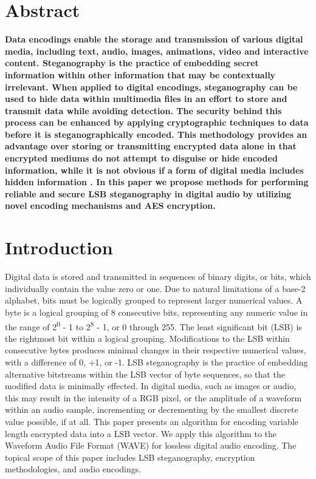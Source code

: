 \section*{Abstract}
\textbf{
Data encodings enable the storage and transmission of various digital media, including text, audio, images, animations, video and interactive content. Steganography is the practice of embedding secret information within other information that may be contextually irrelevant. When applied to digital encodings, steganography can be used to hide data within multimedia files in an effort to store and transmit data while avoiding detection. The security behind this process can be enhanced by applying cryptographic techniques to data before it is steganographically encoded. This methodology provides an advantage over storing or transmitting encrypted data alone in that encrypted mediums do not attempt to disguise or hide encoded information, while it is not obvious if a form of digital media includes hidden information \cite{paper8}. In this paper we propose methods for performing reliable and secure LSB steganography in digital audio by utilizing novel encoding mechanisms and AES encryption.}


\section{Introduction}
Digital data is stored and transmitted in sequences of binary digits, or bits, which individually contain the value zero or one. Due to natural limitations of a base-2 alphabet, bits must be logically grouped to represent larger numerical values. A byte is a logical grouping of 8 consecutive bits, representing any numeric value in the range of 2\textsuperscript{0} - 1 to 2\textsuperscript{8} - 1, or 0 through 255. The least significant bit (LSB) is the rightmost bit within a logical grouping. Modifications to the LSB within consecutive bytes produces minimal changes in their respective numerical values, with a difference of 0, +1, or -1.
LSB steganography is the practice of embedding alternative bitstreams within the LSB vector of byte sequences, so that the modified data is minimally effected. In digital media, such as images or audio, this may result in the intensity of a RGB pixel, or the amplitude of a waveform within an audio sample, incrementing or decrementing by the smallest discrete value possible, if at all. This paper presents an algorithm for encoding variable length encrypted data into a LSB vector. We apply this algorithm to the Waveform Audio File Format (WAVE) for lossless digital audio encoding. The topical scope of this paper includes LSB steganography, encryption methodologies, and audio encodings.

